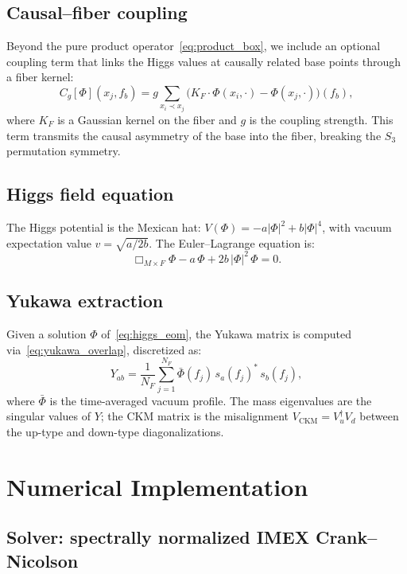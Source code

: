 \documentclass[12pt,a4paper]{article}
\begin{document}
\subsection{Causal--fiber coupling}

Beyond the pure product operator~\eqref{eq:product_box}, we include an
optional coupling term that links the Higgs values at causally related
base points through a fiber kernel:
\begin{equation}
  C_g[\Phi](x_j, f_b) = g \sum_{x_i \prec x_j}
    \bigl(K_F \cdot \Phi(x_i, \cdot) - \Phi(x_j, \cdot)\bigr)(f_b),
\end{equation}
where $K_F$ is a Gaussian kernel on the fiber and $g$ is the coupling
strength.  This term transmits the causal asymmetry of the base into
the fiber, breaking the $S_3$ permutation symmetry.

\subsection{Higgs field equation}

The Higgs potential is the Mexican hat:
$V(\Phi) = -a|\Phi|^2 + b|\Phi|^4$, with vacuum expectation value
$v = \sqrt{a/2b}$.  The Euler--Lagrange equation is:
\begin{equation}
  \Box_{M \times F} \Phi - a\,\Phi + 2b\,|\Phi|^2\,\Phi = 0.
  \label{eq:higgs_eom}
\end{equation}

\subsection{Yukawa extraction}

Given a solution $\Phi$ of~\eqref{eq:higgs_eom}, the Yukawa matrix is
computed via~\eqref{eq:yukawa_overlap}, discretized as:
\begin{equation}
  Y_{ab} = \frac{1}{N_F} \sum_{j=1}^{N_F}
    \bar{\Phi}(f_j)\, s_a(f_j)^*\, s_b(f_j),
\end{equation}
where $\bar{\Phi}$ is the time-averaged vacuum profile.  The mass
eigenvalues are the singular values of $Y$; the CKM matrix is the
misalignment $V_{\text{CKM}} = V_u^\dagger V_d$ between the up-type
and down-type diagonalizations.

\section{Numerical Implementation}

\subsection{Solver: spectrally normalized IMEX Crank--Nicolson}
\end{document}
